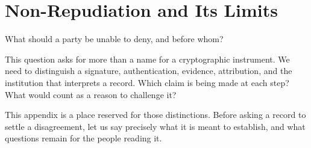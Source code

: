 \chapter{Non-Repudiation and Its Limits}
\label{short:non-repudiation}

What should a party be unable to deny, and before whom?

This question asks for more than a name for a cryptographic instrument. We
need to distinguish a signature, authentication, evidence, attribution, and
the institution that interprets a record. Which claim is being made at each
step? What would count as a reason to challenge it?

This appendix is a place reserved for those distinctions. Before asking a
record to settle a disagreement, let us say precisely what it is meant to
establish, and what questions remain for the people reading it.

